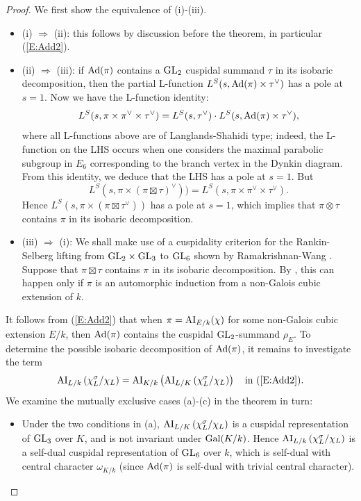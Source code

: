 \documentclass[11pt]{amsart}
\theoremstyle{plain}
\numberwithin{equation}{section}
\def\GL{{\rm GL}}
\begin{document}
\begin{proof}
We first show the equivalence of (i)-(iii). 
\vskip 5pt
\begin{itemize}
\item (i) $\Longrightarrow$ (ii): this  follows by discussion before the theorem, in particular (\ref{E:Add2}). 
\vskip 5pt

\item (ii) $\Longrightarrow$ (iii):  if ${\rm Ad}(\pi)$ contains a $\GL_2$ cuspidal summand $\tau$ in its isobaric decomposition, then the partial L-function $L^S(s, {\rm Ad}(\pi) \times \tau^{\vee})$ has a pole at $s=1$.  Now we have the L-function identity:
\[  L^S(s, \pi \times \pi^{\vee} \times \tau^{\vee}) = L^S(s, \tau^{\vee}) \cdot L^S(s, {\rm Ad}(\pi) \times \tau^{\vee}), \]
where all L-functions above are of Langlands-Shahidi type; indeed, the L-function on the LHS occurs when one considers the maximal parabolic subgroup in $E_6$ corresponding to the branch vertex in the Dynkin diagram.
From this identity, we deduce that the LHS has a pole at $s=1$. But
\[  L^S(s, \pi \times (\pi \boxtimes \tau)^{\vee})) =  L^S(s, \pi \times \pi^{\vee} \times \tau^{\vee}). \]
Hence $L^S(s, \pi \times (\pi \boxtimes \tau^{\vee}))$ has a pole at $s=1$, which implies that $\pi \otimes \tau$ contains $\pi$ in its isobaric decomposition.
\vskip 5pt

\item (iii) $\Longrightarrow$ (i): 
We shall make use of a cuspidality criterion for the Rankin-Selberg lifting from $\GL_2 \times \GL_3$ to $\GL_6$ shown by Ramakrishnan-Wang \cite{RW}. 
Suppose that $\pi \boxtimes \tau$ contains $\pi$ in its isobaric decomposition.  By \cite[Thm. 3.1]{RW}, this can happen only if 
$\pi$ is an automorphic induction from a non-Galois cubic extension of $k$.
\end{itemize}
\vskip 5pt

It follows from (\ref{E:Add2}) that when $\pi ={\rm AI}_{E/k}(\chi)$ for some non-Galois cubic extension $E/k$, then  ${\rm Ad}(\pi)$ contains the cuspidal $\GL_2$-summand $\rho_E$. 
To determine the possible isobaric decomposition of ${\rm Ad}(\pi)$, it remains to investigate the term 
\[  {\rm AI}_{L/k}\left( \chi_L^{\sigma}/ \chi_L \right) = {\rm AI}_{K/k} \left( {\rm AI}_{L/K} \left( \chi_L^{\sigma}/ \chi_L \right) \right) \quad \text{in (\ref{E:Add2}).}  \]
We examine the mutually exclusive cases (a)-(c) in the theorem in turn:
\vskip 5pt

\begin{itemize}
\item[(a)] Under the two conditions in (a),  ${\rm AI}_{L/K} \left( \chi_L^{\sigma}/ \chi_L \right)$ is a cuspidal representation of $\GL_3$ over $K$, and is not invariant under ${\rm Gal}(K/k)$. Hence
$ {\rm AI}_{L/k}\left( \chi_L^{\sigma}/ \chi_L \right) $ is a self-dual cuspidal representation of $\GL_6$ over $k$, which is self-dual with central character $\omega_{K/k}$ (since ${\rm Ad}(\pi)$ is self-dual with trivial central character).
\vskip 5pt


\end{itemize}
\end{proof}
\end{document}

